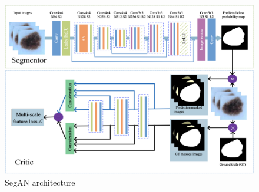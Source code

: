 \begin{figure}
    \centerline{\includegraphics[width=1\columnwidth]{04-methodology/figures/segan-architecture.png}}
    \caption{SegAN architecture}
    \label{figure:segan-architecture}
\end{figure}